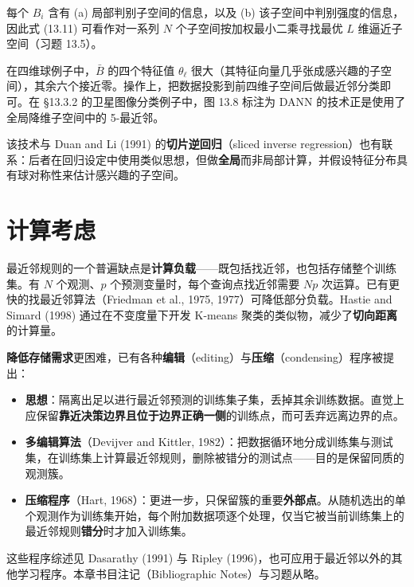 \begin{remark}[理解与联系]
每个 $B_i$ 含有 (a) 局部判别子空间的信息，以及 (b) 该子空间中判别强度的信息，因此式 (13.11) 可看作对一系列 $N$ 个子空间按加权最小二乘寻找最优 $L$ 维逼近子空间（习题 13.5）。

在四维球例子中，$\bar{B}$ 的四个特征值 $\theta_\ell$ 很大（其特征向量几乎张成感兴趣的子空间），其余六个接近零。操作上，把数据投影到前四维子空间后做最近邻分类即可。在 §13.3.2 的卫星图像分类例子中，图 13.8 标注为 DANN 的技术正是使用了全局降维子空间中的 5-最近邻。

该技术与 Duan and Li (1991) 的\textbf{切片逆回归}（sliced inverse regression）也有联系：后者在回归设定中使用类似思想，但做\textbf{全局}而非局部计算，并假设特征分布具有球对称性来估计感兴趣的子空间。
\end{remark}

\section{计算考虑}

最近邻规则的一个普遍缺点是\textbf{计算负载}——既包括找近邻，也包括存储整个训练集。有 $N$ 个观测、$p$ 个预测变量时，每个查询点找近邻需要 $Np$ 次运算。已有更快的找最近邻算法（Friedman et al., 1975, 1977）可降低部分负载。Hastie and Simard (1998) 通过在不变度量下开发 K-means 聚类的类似物，减少了\textbf{切向距离}的计算量。

\textbf{降低存储需求}更困难，已有各种\textbf{编辑}（editing）与\textbf{压缩}（condensing）程序被提出：

\begin{itemize}[itemsep=1pt]
\item \textbf{思想}：隔离出足以进行最近邻预测的训练集子集，丢掉其余训练数据。直觉上应保留\textbf{靠近决策边界且位于边界正确一侧}的训练点，而可丢弃远离边界的点。
\item \textbf{多编辑算法}（Devijver and Kittler, 1982）：把数据循环地分成训练集与测试集，在训练集上计算最近邻规则，删除被错分的测试点——目的是保留同质的观测簇。
\item \textbf{压缩程序}（Hart, 1968）：更进一步，只保留簇的重要\textbf{外部点}。从随机选出的单个观测作为训练集开始，每个附加数据项逐个处理，仅当它被当前训练集上的最近邻规则\textbf{错分}时才加入训练集。
\end{itemize}

这些程序综述见 Dasarathy (1991) 与 Ripley (1996)，也可应用于最近邻以外的其他学习程序。本章书目注记（Bibliographic Notes）与习题从略。

